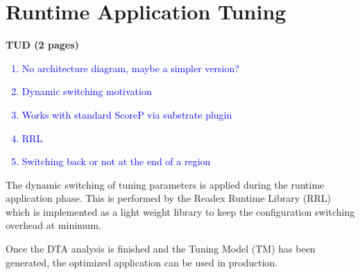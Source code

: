 \section{Runtime Application Tuning} \label{rat}
\textbf{TUD (2 pages)}

\textcolor{blue}{\begin{enumerate}
  \item No architecture diagram, maybe a simpler version?
  \item Dynamic switching motivation
  \item Works with standard ScoreP via substrate plugin
  \item RRL
  \item Switching back or not at the end of a region
\end{enumerate}
}

The dynamic switching of tuning parameters is applied during the runtime application phase. This is performed by the Readex Runtime Library (RRL) which is implemented as a light weight library to keep the configuration switching overhead at minimum.

Once the DTA analysis is finished and the Tuning Model (TM) has been generated, the optimized application can be used in production. 